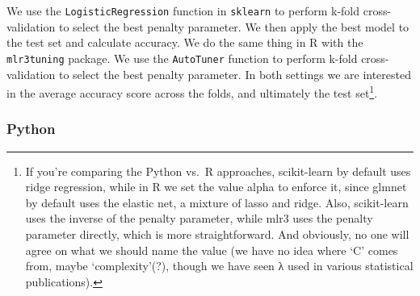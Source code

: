 \documentclass[
  letterpaper,
]{krantz}
\begin{document}
We use the \texttt{LogisticRegression} function in \texttt{sklearn} to
perform k-fold cross-validation to select the best penalty parameter. We
then apply the best model to the test set and calculate accuracy. We do
the same thing in R with the \texttt{mlr3tuning} package. We use the
\texttt{AutoTuner} function to perform k-fold cross-validation to select
the best penalty parameter. In both settings we are interested in the
average accuracy score across the folds, and ultimately the test
set\footnote{If you're comparing the Python vs.~R approaches,
  scikit-learn by default uses ridge regression, while in R we set the
  value alpha to enforce it, since glmnet by default uses the elastic
  net, a mixture of lasso and ridge. Also, scikit-learn uses the inverse
  of the penalty parameter, while mlr3 uses the penalty parameter
  directly, which is more straightforward. And obviously, no one will
  agree on what we should name the value (we have no idea where `C'
  comes from, maybe `complexity'(?), though we have seen λ used in
  various statistical publications).}.

\subsubsection{Python}
\end{document}
